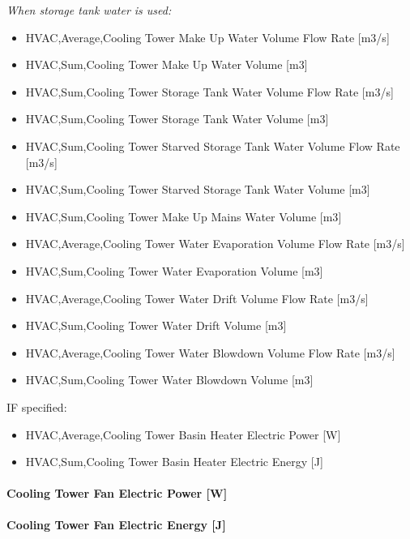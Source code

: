 \emph{When storage tank water is used:}

\begin{itemize}
\item
  HVAC,Average,Cooling Tower Make Up Water Volume Flow Rate {[}m3/s{]}
\item
  HVAC,Sum,Cooling Tower Make Up Water Volume {[}m3{]}
\item
  HVAC,Sum,Cooling Tower Storage Tank Water Volume Flow Rate {[}m3/s{]}
\item
  HVAC,Sum,Cooling Tower Storage Tank Water Volume {[}m3{]}
\item
  HVAC,Sum,Cooling Tower Starved Storage Tank Water Volume Flow Rate {[}m3/s{]}
\item
  HVAC,Sum,Cooling Tower Starved Storage Tank Water Volume {[}m3{]}
\item
  HVAC,Sum,Cooling Tower Make Up Mains Water Volume {[}m3{]}
\item
  HVAC,Average,Cooling Tower Water Evaporation Volume Flow Rate {[}m3/s{]}
\item
  HVAC,Sum,Cooling Tower Water Evaporation Volume {[}m3{]}
\item
  HVAC,Average,Cooling Tower Water Drift Volume Flow Rate {[}m3/s{]}
\item
  HVAC,Sum,Cooling Tower Water Drift Volume {[}m3{]}
\item
  HVAC,Average,Cooling Tower Water Blowdown Volume Flow Rate {[}m3/s{]}
\item
  HVAC,Sum,Cooling Tower Water Blowdown Volume {[}m3{]}
\end{itemize}

IF specified:

\begin{itemize}
\item
  HVAC,Average,Cooling Tower Basin Heater Electric Power {[}W{]}
\item
  HVAC,Sum,Cooling Tower Basin Heater Electric Energy {[}J{]}
\end{itemize}

\paragraph{Cooling Tower Fan Electric Power {[}W{]}}\label{cooling-tower-fan-electric-power-w-2}

\paragraph{Cooling Tower Fan Electric Energy {[}J{]}}\label{cooling-tower-fan-electric-energy-j-2}

